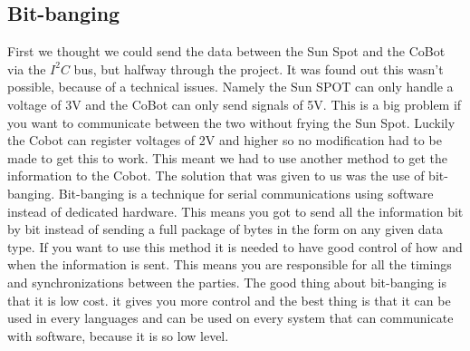 \documentclass[a4,english]{article}
\begin{document}
\subsection{Bit-banging}
\label{subsec:bitbang}
First we thought we could send the data between the Sun Spot and the CoBot via the $I^2C$ bus, but halfway through the project. It was found out this wasn't possible, because of a technical issues. Namely the Sun SPOT can only handle a voltage of 3V and the CoBot can only send signals of 5V. This is a big problem if you want to communicate between the two without frying the Sun Spot. Luckily the Cobot can register voltages of 2V and higher so no modification had to be made to get this to work. 
This meant we had to use another method to get the information to the Cobot. The solution that was given to us was the use of bit-banging. Bit-banging is a technique for serial communications using software instead of dedicated hardware. This means you got to send all the information bit by bit instead of sending a full package of bytes in the form on any given data type. If you want to use this method it is needed to have good control of how and when the information is sent. This means you are responsible for all the timings and synchronizations between the parties. The good thing about bit-banging is that it is low cost. it gives you more control and the best thing is that it can be used in every languages and can be used on every system that can communicate with software, because it is so low level.
\end{document}
